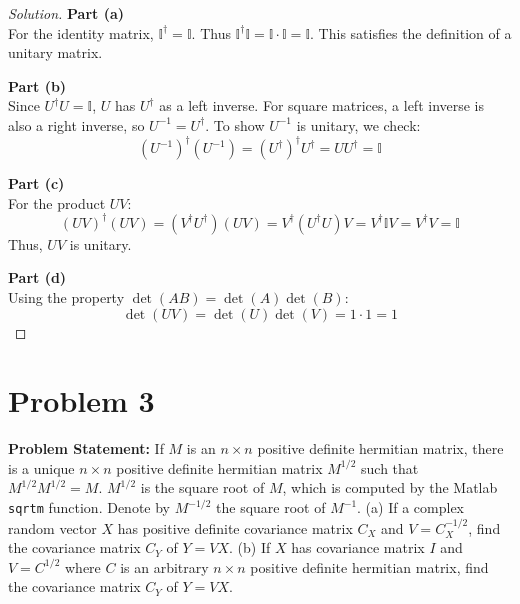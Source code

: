\documentclass{article}
\begin{document}
\begin{proof}[Solution]
	\textbf{Part (a)}\\
	For the identity matrix, $\mathbb{I}^\dagger = \mathbb{I}$. Thus $\mathbb{I}^\dagger \mathbb{I} = \mathbb{I} \cdot \mathbb{I} = \mathbb{I}$. This satisfies the definition of a unitary matrix.
	
	\textbf{Part (b)}\\
	Since $U^\dagger U = \mathbb{I}$, $U$ has $U^\dagger$ as a left inverse. For square matrices, a left inverse is also a right inverse, so $U^{-1} = U^\dagger$. To show $U^{-1}$ is unitary, we check:
	\[ (U^{-1})^\dagger (U^{-1}) = (U^\dagger)^\dagger U^\dagger = U U^\dagger = \mathbb{I} \]
	
	\textbf{Part (c)}\\
	For the product $UV$:
	\[ (UV)^\dagger (UV) = (V^\dagger U^\dagger)(UV) = V^\dagger (U^\dagger U) V = V^\dagger \mathbb{I} V = V^\dagger V = \mathbb{I} \]
	Thus, $UV$ is unitary.
	
	\textbf{Part (d)}\\
	Using the property $\det(AB) = \det(A)\det(B)$:
	\[ \det(UV) = \det(U)\det(V) = 1 \cdot 1 = 1 \]
\end{proof}

\vspace{1cm}

\section*{Problem 3}
\textbf{Problem Statement:}
If $M$ is an $n\times n$ positive definite hermitian matrix, there is a unique $n\times n$ positive definite hermitian matrix $M^{1/2}$ such that $M^{1/2}M^{1/2} = M$. $M^{1/2}$ is the square root of $M$, which is computed by the Matlab \texttt{sqrtm} function. Denote by $M^{-1/2}$ the square root of $M^{-1}$.
(a) If a complex random vector $X$ has positive definite covariance matrix $C_X$ and $V = C_X^{-1/2}$, find the covariance matrix $C_Y$ of $Y = VX$.
(b) If $X$ has covariance matrix $I$ and $V = C^{1/2}$ where $C$ is an arbitrary $n\times n$ positive definite hermitian matrix, find the covariance matrix $C_Y$ of $Y = VX$.
\end{document}
